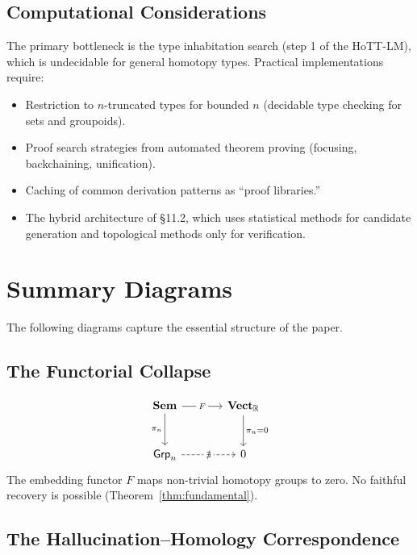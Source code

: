 \documentclass[11pt,a4paper]{article}
\theoremstyle{plain}
\theoremstyle{definition}
\newcommand{\Sem}{\mathbf{Sem}}
\newcommand{\Vect}{\mathbf{Vect}}
\begin{document}
\subsection{Computational Considerations}

The primary bottleneck is the type inhabitation search (step 1 of the HoTT-LM), which is undecidable for general homotopy types. Practical implementations require:
\begin{itemize}[nosep]
  \item Restriction to $n$-truncated types for bounded $n$ (decidable type checking for sets and groupoids).
  \item Proof search strategies from automated theorem proving (focusing, backchaining, unification).
  \item Caching of common derivation patterns as ``proof libraries.''
  \item The hybrid architecture of \S11.2, which uses statistical methods for candidate generation and topological methods only for verification.
\end{itemize}

\section{Summary Diagrams}\label{sec:diagrams}

The following diagrams capture the essential structure of the paper.

\subsection{The Functorial Collapse}

\begin{equation}\label{diag:collapse}
\begin{tikzcd}[column sep=large, row sep=large]
\Sem \arrow[r, "F" {description}] \arrow[d, "\pi_n"'] & \Vect_{\mathbb{R}} \arrow[d, "\pi_n = 0"] \\
\mathsf{Grp}_n \arrow[r, dashed, "\nexists"' {description}] & 0
\end{tikzcd}
\end{equation}
The embedding functor $F$ maps non-trivial homotopy groups to zero. No faithful recovery is possible (Theorem~\ref{thm:fundamental}).

\subsection{The Hallucination--Homology Correspondence}
\end{document}
